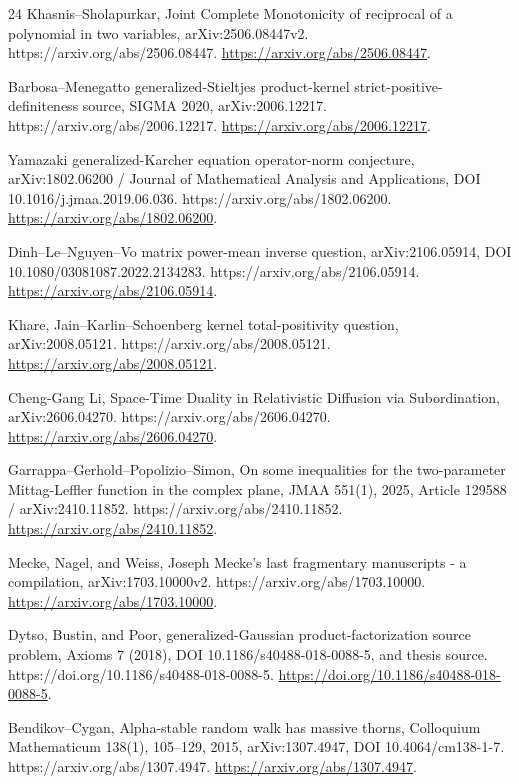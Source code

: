 \documentclass[11pt]{article}
\numberwithin{equation}{section}
\theoremstyle{definition}
\theoremstyle{remark}
\newcommand{\1}{\mathbf 1}
\begin{document}
\begin{thebibliography}{24}
Khasnis--Sholapurkar, Joint Complete Monotonicity of reciprocal of a polynomial in two variables, arXiv:2506.08447v2. https://arxiv.org/abs/2506.08447.
\url{https://arxiv.org/abs/2506.08447}.

Barbosa--Menegatto generalized-Stieltjes product-kernel strict-positive-definiteness source, SIGMA 2020, arXiv:2006.12217. https://arxiv.org/abs/2006.12217.
\url{https://arxiv.org/abs/2006.12217}.

Yamazaki generalized-Karcher equation operator-norm conjecture, arXiv:1802.06200 / Journal of Mathematical Analysis and Applications, DOI 10.1016/j.jmaa.2019.06.036. https://arxiv.org/abs/1802.06200.
\url{https://arxiv.org/abs/1802.06200}.

Dinh--Le--Nguyen--Vo matrix power-mean inverse question, arXiv:2106.05914, DOI 10.1080/03081087.2022.2134283. https://arxiv.org/abs/2106.05914.
\url{https://arxiv.org/abs/2106.05914}.

Khare, Jain--Karlin--Schoenberg kernel total-positivity question, arXiv:2008.05121. https://arxiv.org/abs/2008.05121.
\url{https://arxiv.org/abs/2008.05121}.

Cheng-Gang Li, Space-Time Duality in Relativistic Diffusion via Subordination, arXiv:2606.04270. https://arxiv.org/abs/2606.04270.
\url{https://arxiv.org/abs/2606.04270}.

Garrappa--Gerhold--Popolizio--Simon, On some inequalities for the two-parameter Mittag-Leffler function in the complex plane, JMAA 551(1), 2025, Article 129588 / arXiv:2410.11852. https://arxiv.org/abs/2410.11852.
\url{https://arxiv.org/abs/2410.11852}.

Mecke, Nagel, and Weiss, Joseph Mecke's last fragmentary manuscripts - a compilation, arXiv:1703.10000v2. https://arxiv.org/abs/1703.10000.
\url{https://arxiv.org/abs/1703.10000}.

Dytso, Bustin, and Poor, generalized-Gaussian product-factorization source problem, Axioms 7 (2018), DOI 10.1186/s40488-018-0088-5, and thesis source. https://doi.org/10.1186/s40488-018-0088-5.
\url{https://doi.org/10.1186/s40488-018-0088-5}.

Bendikov--Cygan, Alpha-stable random walk has massive thorns, Colloquium Mathematicum 138(1), 105--129, 2015, arXiv:1307.4947, DOI 10.4064/cm138-1-7. https://arxiv.org/abs/1307.4947.
\url{https://arxiv.org/abs/1307.4947}.


\end{thebibliography}
\end{document}
